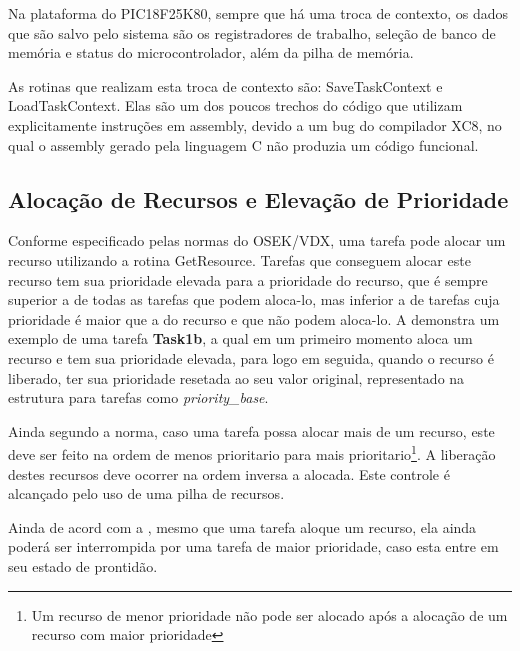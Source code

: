 Na plataforma do PIC18F25K80, sempre que há uma troca de contexto, os dados que são salvo pelo sistema são os registradores de trabalho, seleção de banco de memória e status do microcontrolador, além da pilha de memória.

As rotinas que realizam esta troca de contexto são: SaveTaskContext e LoadTaskContext. Elas são um dos poucos trechos do código que utilizam explicitamente instruções em assembly, devido a um bug do compilador XC8, no qual o assembly gerado pela linguagem C não produzia um código funcional.

\subsection{Alocação de Recursos e Elevação de Prioridade}

Conforme especificado pelas normas do OSEK/VDX, uma tarefa pode alocar um recurso utilizando a rotina GetResource. Tarefas que conseguem alocar este recurso tem sua prioridade elevada para a prioridade do recurso, que é sempre superior a de todas as tarefas que podem aloca-lo, mas inferior a de tarefas cuja prioridade é maior que a do recurso e que não podem aloca-lo. A  demonstra um exemplo de uma tarefa \textbf{Task1b}, a qual em um primeiro momento aloca um recurso e tem sua prioridade elevada, para logo em seguida, quando o recurso é liberado, ter sua prioridade resetada ao seu valor original, representado na estrutura para tarefas como \emph{priority\_base}.


Ainda segundo a norma, caso uma tarefa possa alocar mais de um recurso, este deve ser feito na ordem de menos prioritario para mais prioritario\footnote{Um recurso de menor prioridade não pode ser alocado após a alocação de um recurso com maior prioridade}. A liberação destes recursos deve ocorrer na ordem inversa a alocada. Este controle é alcançado pelo uso de uma pilha de recursos.

Ainda de acord com a , mesmo que uma tarefa aloque um recurso, ela ainda poderá ser interrompida por uma tarefa de maior prioridade, caso esta entre em seu estado de prontidão.